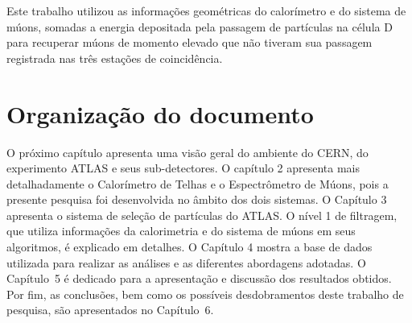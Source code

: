 Este trabalho utilizou as informações geométricas do calorímetro e do sistema de
múons, somadas a energia depositada pela passagem de partículas na célula D para
recuperar múons de momento elevado que não tiveram sua passagem registrada nas
três estações de coincidência.

\section{Organização do documento}

O próximo capítulo apresenta uma visão geral do ambiente do CERN, do experimento
ATLAS e seus sub-detectores.  O capítulo 2 apresenta mais detalhadamente o
Calorímetro de Telhas e o Espectrômetro de Múons, pois a presente pesquisa foi
desenvolvida no âmbito dos dois sistemas.  O Capítulo 3 apresenta o sistema de
seleção de partículas do ATLAS. O nível 1 de filtragem, que utiliza informações
da calorimetria e do sistema de múons em seus algoritmos, é explicado em
detalhes. O Capítulo 4 mostra a base de dados utilizada para realizar as
análises e as diferentes abordagens adotadas. O Capítulo~5  é dedicado para a
apresentação e discussão dos resultados obtidos.   Por fim, as conclusões, bem
como os possíveis desdobramentos deste trabalho de pesquisa, são apresentados no
Capítulo~6.
